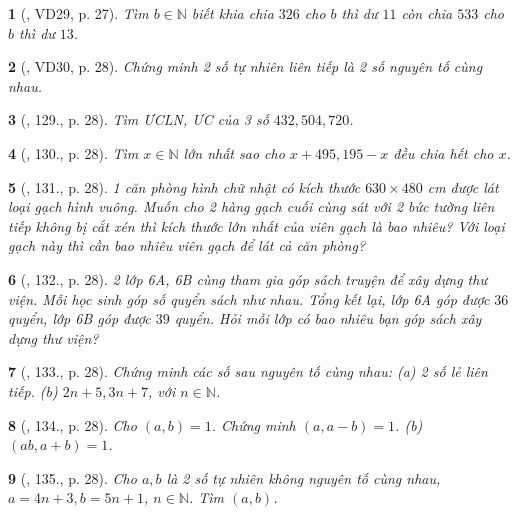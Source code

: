 \documentclass{article}
\newtheorem{baitoan}{}
\begin{document}
\begin{baitoan}[\cite{Tuyen_Toan_6}, VD29, p. 27]
	Tìm $b\in\mathbb{N}$ biết khia chia $326$ cho $b$ thì dư $11$ còn chia $533$ cho $b$ thì dư $13$.
\end{baitoan}

\begin{baitoan}[\cite{Tuyen_Toan_6}, VD30, p. 28]
	Chứng minh 2 số tự nhiên liên tiếp là 2 số nguyên tố cùng nhau.
\end{baitoan}

\begin{baitoan}[\cite{Tuyen_Toan_6}, 129., p. 28]
	Tìm {\rm ƯCLN, ƯC} của 3 số $432,504,720$.
\end{baitoan}

\begin{baitoan}[\cite{Tuyen_Toan_6}, 130., p. 28]
	Tìm $x\in\mathbb{N}$ lớn nhất sao cho $x + 495,195 - x$ đều chia hết cho $x$.
\end{baitoan}

\begin{baitoan}[\cite{Tuyen_Toan_6}, 131., p. 28]
	1 căn phòng hình chữ nhật có kích thước $630\times480$ {\rm cm} được lát loại gạch hình vuông. Muốn cho 2 hàng gạch cuối cùng sát với 2 bức tường liên tiếp không bị cắt xén thì kích thước lớn nhất của viên gạch là bao nhiêu? Với loại gạch này thì cần bao nhiêu viên gạch để lát cả căn phòng?
\end{baitoan}

\begin{baitoan}[\cite{Tuyen_Toan_6}, 132., p. 28]
	2 lớp 6A, 6B cùng tham gia góp sách truyện để xây dựng thư viện. Mỗi học sinh góp số quyển sách như nhau. Tổng kết lại, lớp 6A góp được $36$ quyển, lớp 6B góp được $39$ quyển. Hỏi mỗi lớp có bao nhiêu bạn góp sách xây dựng thư viện?
\end{baitoan}

\begin{baitoan}[\cite{Tuyen_Toan_6}, 133., p. 28]
	Chứng minh các số sau nguyên tố cùng nhau: (a) 2 số lẻ liên tiếp. (b) $2n + 5,3n + 7$, với $n\in\mathbb{N}$.
\end{baitoan}

\begin{baitoan}[\cite{Tuyen_Toan_6}, 134., p. 28]
	Cho $(a,b) = 1$. Chứng minh $(a,a - b) = 1$. (b) $(ab,a + b) = 1$.
\end{baitoan}

\begin{baitoan}[\cite{Tuyen_Toan_6}, 135., p. 28]
	Cho $a,b$ là 2 số tự nhiên không nguyên tố cùng nhau, $a = 4n + 3,b = 5n + 1$, $n\in\mathbb{N}$. Tìm $(a,b)$.
\end{baitoan}
\end{document}

